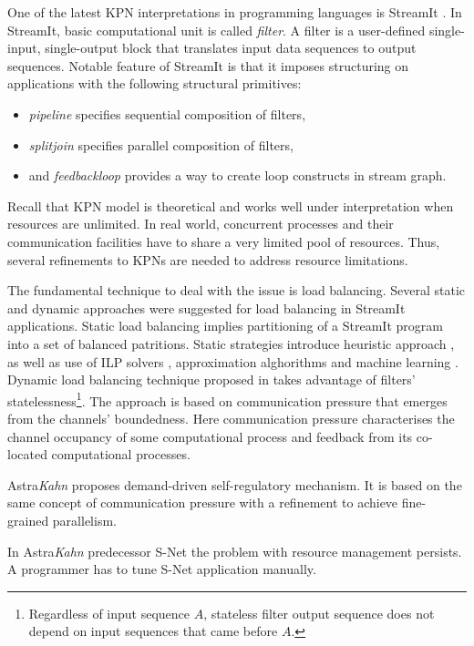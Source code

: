 One of the latest KPN interpretations in programming languages is StreamIt \cite{streamit}. In StreamIt, basic computational unit is called \emph{filter}. A filter is a user-defined single-input, single-output block that translates input data sequences to output sequences. Notable feature of StreamIt is that it imposes structuring on applications with the following structural primitives:
\begin{itemize}
\item \emph{pipeline} specifies sequential composition of filters,
\item \emph{splitjoin} specifies parallel composition of filters,
\item and \emph{feedbackloop} provides a way to create loop constructs in stream graph.
\end{itemize}

Recall that KPN model is theoretical and works well under interpretation when resources are unlimited. In real world, concurrent processes and their communication facilities have to share a very limited pool of resources. Thus, several refinements to KPNs are needed to address resource limitations.

The fundamental technique to deal with the issue is load balancing. Several static and dynamic approaches were suggested for load balancing in StreamIt applications. Static load balancing implies partitioning of a StreamIt program into a set of balanced patritions. Static strategies introduce heuristic approach \cite{streamit}, as well as use of ILP solvers \cite{kudlur}, approximation alghorithms \cite{farhad} and machine learning \cite{wang}. Dynamic load balancing technique proposed in \cite{collins} takes advantage of filters' statelessness\footnote{Regardless of input sequence $A$, stateless filter output sequence does not depend on input sequences that came before $A$.}. The approach is based on communication pressure that emerges from the channels' boundedness. Here communication pressure characterises the channel occupancy of some computational process and feedback from its co-located computational processes.

Astra\emph{Kahn} proposes demand-driven self-regulatory mechanism. It is based on the same concept of communication pressure with a refinement to achieve fine-grained parallelism.

In Astra\emph{Kahn} predecessor S-Net \cite{snet_intro} the problem with resource management persists. A programmer has to tune S-Net application manually.


